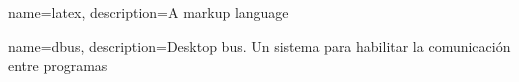 \makeglossaries

{
	name=latex,
	description={A markup language}
}

{
	name=dbus,
	description={Desktop bus. Un sistema para habilitar la comunicación entre programas}
}
